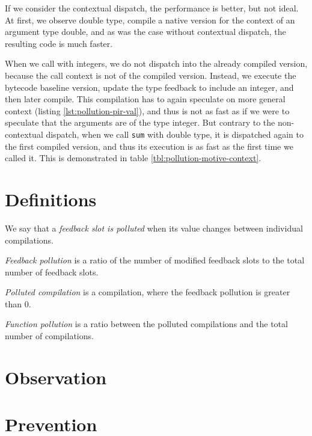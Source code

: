 If we consider the contextual dispatch, the performance is better, but not ideal. At first, we observe double type, compile a native version for the context of an argument type double, and as was the case without contextual dispatch, the resulting code is much faster.

When we call with integers, we do not dispatch into the already compiled version, because the call context is not  of the compiled version. Instead, we execute the bytecode baseline version, update the type feedback to include an integer, and then later compile. This compilation has to again speculate on more general context (listing \ref{lst:pollution-pir-val}), and thus is not as fast as if we were to speculate that the arguments are of the type integer. But contrary to the non-contextual dispatch, when we call \texttt{sum} with double type, it is dispatched again to the first compiled version, and thus its execution is as fast as the first time we called it. This is demonstrated in table \ref{tbl:pollution-motive-context}.

\section{Definitions}

We say that a \textit{feedback slot is polluted} when its value changes between individual compilations.

\textit{Feedback pollution} is a ratio of the number of modified feedback slots to the total number of feedback slots.

\textit{Polluted compilation} is a compilation, where the feedback pollution is greater than 0.

\textit{Function pollution} is a ratio between the polluted compilations and the total number of compilations.

\section{Observation}

\section{Prevention}

